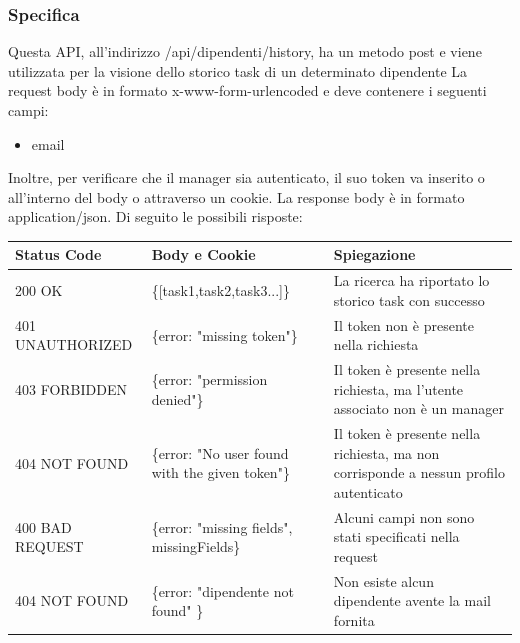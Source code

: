 \documentclass{report}
\begin{document}
\subsubsection*{Specifica}
Questa API, all'indirizzo /api/dipendenti/history, ha un metodo post e viene utilizzata per la visione dello storico task di un determinato dipendente
La request body è in formato x-www-form-urlencoded e deve contenere i seguenti campi:
\begin{itemize}
	\item email
\end{itemize}
Inoltre, per verificare che il manager sia autenticato, il suo token va inserito o all'interno del body o attraverso un cookie.
La response body è in formato application/json. Di seguito le possibili risposte:
\begin{center} %
	\centering
	\begin{tabular}{ |p{4cm}|p{5cm}|p{4cm}| }
		\hline
		\centering Status Code & \qquad\quad Body e Cookie                       & \qquad\qquad Spiegazione                                                             \\ %
		\hline
		200 OK                 & \{[task1,task2,task3...]\}                      & La ricerca ha riportato lo storico task con successo                                 \\
		\hline
		401 UNAUTHORIZED       & \{error: "missing token"\}                      & Il token non è presente nella richiesta                                              \\
		\hline
		403 FORBIDDEN          & \{error: "permission denied"\}                  & Il token è presente nella richiesta, ma l'utente associato non è un manager          \\
		\hline
		404 NOT FOUND          & \{error: "No user found with the given token"\} & Il token è presente nella richiesta, ma non corrisponde a nessun profilo autenticato \\
		\hline
		400 BAD REQUEST        & \{error: "missing fields", missingFields\}      & Alcuni campi non sono stati specificati nella request                                \\ %
		\hline
		404 NOT FOUND          & \{error: "dipendente not found" \}              & Non esiste alcun dipendente avente la mail fornita                                   \\
		\hline
	\end{tabular}
\end{center}
\end{document}
